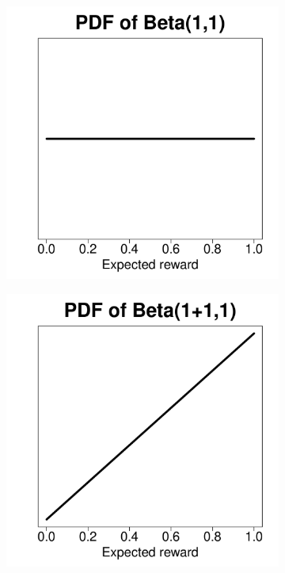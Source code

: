 \documentclass{article} %
\begin{document}
\begin{figure}[H]
  \centering
  \begin{subfigure}{.25\textwidth}
    \centering
    \includegraphics[width=.9\linewidth]{beta1.pdf}
  \end{subfigure}%
  \begin{subfigure}{.25\textwidth}
    \centering
    \includegraphics[width=.9\linewidth]{beta2.pdf}

\end{subfigure}
\end{figure}
\end{document}
